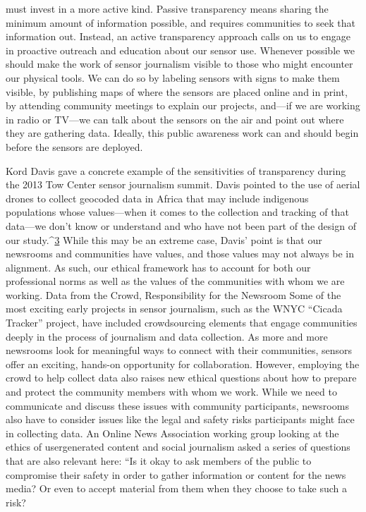 must invest in a more active kind. Passive transparency means sharing the
minimum amount of information possible, and requires communities to
seek that information out. Instead, an active transparency approach calls
on us to engage in proactive outreach and education about our sensor use.
Whenever possible we should make the work of sensor journalism visible
to those who might encounter our physical tools. We can do so by labeling
sensors with signs to make them visible, by publishing maps of where the
sensors are placed online and in print, by attending community meetings to
explain our projects, and—if we are working in radio or TV—we can talk
about the sensors on the air and point out where they are gathering data.
Ideally, this public awareness work can and should begin before the sensors
are deployed.

Kord Davis gave a concrete example of the sensitivities of transparency during
the 2013 Tow Center sensor journalism summit. Davis pointed to the
use of aerial drones to collect geocoded data in Africa that may include
indigenous populations whose values—when it comes to the collection and
tracking of that data—we don't know or understand and who have not been
part of the design of our study.^{\href{#endnotes-stearns}{3}} While this may be an extreme case, Davis'
point is that our newsrooms and communities have values, and those values
may not always be in alignment. As such, our ethical framework has to
account for both our professional norms as well as the values of the communities
with whom we are working.
Data from the Crowd, Responsibility for the Newsroom
Some of the most exciting early projects in sensor journalism, such as the
WNYC ``Cicada Tracker'' project, have included crowdsourcing elements
that engage communities deeply in the process of journalism and data collection.
As more and more newsrooms look for meaningful ways to connect
with their communities, sensors offer an exciting, hands-on opportunity
for collaboration. However, employing the crowd to help collect data also
raises new ethical questions about how to prepare and protect the community
members with whom we work. While we need to communicate and
discuss these issues with community participants, newsrooms also have
to consider issues like the legal and safety risks participants might face in
collecting data.
An Online News Association working group looking at the ethics of usergenerated
content and social journalism asked a series of questions that are
also relevant here: ``Is it okay to ask members of the public to compromise
their safety in order to gather information or content for the news media?
Or even to accept material from them when they choose to take such a risk?

